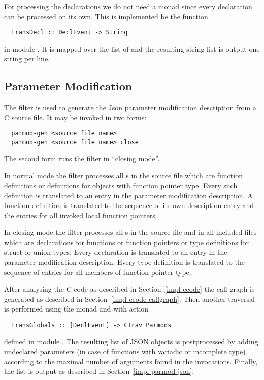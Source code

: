 For processing the declarations we do not need a monad since every declaration can be processed on its own. This is implemented
be the function
\begin{verbatim}
  transDecl :: DeclEvent -> String
\end{verbatim}
in module . It is mapped over the list of  and the resulting string list
is output one string per line.

\subsection{Parameter Modification}
\label{impl-ccomps-parmod}

The filter  is used to generate the Json parameter modification description from a C source file.
It may be invoked in two forms:
\begin{verbatim}
  parmod-gen <source file name>
  parmod-gen <source file name> close
\end{verbatim}
The second form runs the filter in ``closing mode''.

In normal mode the filter processes all s in the source file which are function
definitions or definitions for objects with function pointer type. Every such definition is translated to an
entry in the parameter modification description. A function definition is translated to the sequence of its
own description entry and the entries for all invoked local function pointers.

In closing mode the filter processes all s in the source file and in all included files which
are declarations for functions or function pointers
or type definitions for struct or union types. Every declaration is translated to an entry in the parameter
modification description. Every type definition is translated to the sequence of entries for all members of
function pointer type.

After analysing the C code as described in Section~\ref{impl-ccode} the call graph is generated as described
in Section~\ref{impl-ccode-callgraph}. Then another traversal is performed using the  monad and
 with action
\begin{verbatim}
  transGlobals :: [DeclEvent] -> CTrav Parmods
\end{verbatim}
defined in module . The resulting list of JSON objects is postprocessed by adding
undeclared parameters (in case of functions with variadic or incomplete type) according to the maximal number
of arguments found in the invocations. Finally, the list is output as described in Section~\ref{impl-parmod-json}.





